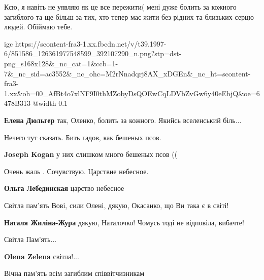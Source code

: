 Ксю, я навіть не уявляю як це все пережити( мені дуже болить за кожного
загиблого та ще більш за тих, хто тепер має жити без рідних та близьких серцю
людей. Обіймаю тебе.

\ifcmt
  igc https://scontent-fra3-1.xx.fbcdn.net/v/t39.1997-6/851586_126361977548599_392107290_n.png?stp=dst-png_s168x128&_nc_cat=1&ccb=1-7&_nc_sid=ac3552&_nc_ohc=M2rNnadqrj8AX_xDGEn&_nc_ht=scontent-fra3-1.xx&oh=00_AfBt4o7xlNF9I0thMZobyDsQOEwCqLDVbZvGw6y40eEbjQ&oe=6478B313
	@width 0.1
\fi

\begin{itemize} %
\textbf{Елена Дюльгер} так, Оленко, болить за кожного. Якийсь вселенський біль...
\end{itemize} %


Нечего тут сказать. Бить гадов, как бешеных псов.

\begin{itemize} %
\textbf{Joseph Kogan} у них слишком много бешеных псов ((
\end{itemize} %


Очень жаль . Сочувствую. Царствие небесное.

\begin{itemize} %
\textbf{Ольга Лебединская} царство небесное
\end{itemize} %


Світла пам'ять Вові, сили Олені, дякую, Окасанко, що Ви така є в світі!

\begin{itemize} %
\textbf{Наталя Жиліна-Жура} дякую, Наталочко! Чомусь тоді не відповіла, вибачте!
\end{itemize} %


Світла Пам'ять...

\begin{itemize} %
\textbf{Olena Zelena} світла!...
\end{itemize} %


Вічна пам'ять всім загиблим співвітчизникам 🙏🙏🙏


